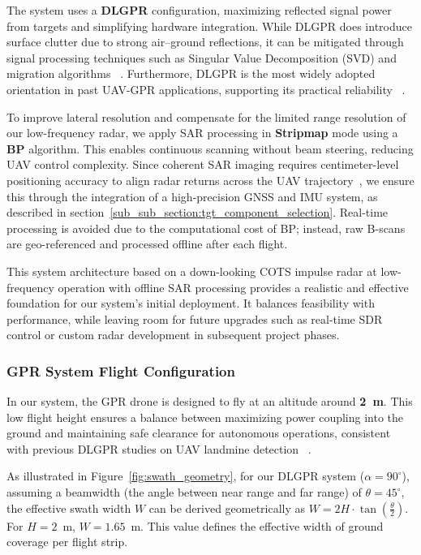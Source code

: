 The system uses a \textbf{\gls{DLGPR}} configuration, maximizing reflected signal power from targets and simplifying hardware integration. While \gls{DLGPR} does introduce surface clutter due to strong air–ground reflections, it can be mitigated through signal processing techniques such as Singular Value Decomposition (SVD) and migration algorithms ~\cite{garcia2024comparison}. Furthermore, \gls{DLGPR} is the most widely adopted orientation in past \gls{UAV}-\gls{GPR} applications, supporting its practical reliability ~\cite{9758040}.

To improve lateral resolution and compensate for the limited range resolution of our low-frequency radar, we apply \gls{SAR} processing in \textbf{Stripmap} mode using a \textbf{\gls{BP}} algorithm. This enables continuous scanning without beam steering, reducing \gls{UAV} control complexity. Since coherent SAR imaging requires centimeter-level positioning accuracy to align radar returns across the UAV trajectory~\cite{fernandez2018synthetic}, we ensure this through the integration of a high-precision GNSS and IMU system, as described in section~\ref{sub_sub_section:tgt_component_selection}. Real-time processing is avoided due to the computational cost of \gls{BP}; instead, raw B-scans are geo-referenced and processed offline after each flight.

This system architecture based on a down-looking \gls{COTS} impulse radar at low-frequency operation with offline \gls{SAR} processing provides a realistic and effective foundation for our system’s initial deployment. It balances feasibility with performance, while leaving room for future upgrades such as real-time \gls{SDR} control or custom radar development in subsequent project phases.



\subsubsection{GPR System Flight Configuration}\label{GPR_flight}

In our system, the \gls{GPR} drone is designed to fly at an altitude around \textbf{2~m}. This low flight height ensures a balance between maximizing power coupling into the ground and maintaining safe clearance for autonomous operations, consistent with previous \gls{DLGPR} studies on \gls{UAV} landmine detection ~\cite{schartel2018uav,9758040}.

As illustrated in Figure~\ref{fig:swath_geometry}, for our \gls{DLGPR} system ($\alpha = 90^\circ$), assuming a beamwidth (the angle between near range and far range) of $\theta = 45^\circ$, the effective swath width $W$ can be derived geometrically as \(W = 2H \cdot \tan\left(\frac{\theta}{2}\right)\). For $H = 2$~m,  $W = 1.65$~m. This value defines the effective width of ground coverage per flight strip.

